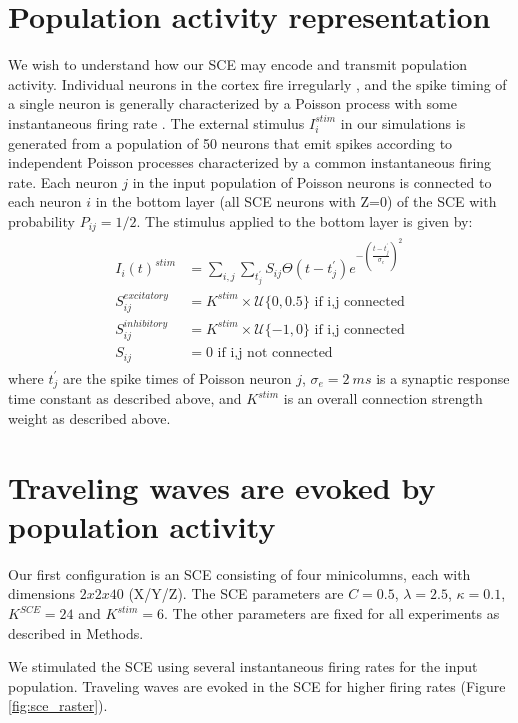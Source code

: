 \section{Population activity representation}
We wish to understand how our SCE may encode and transmit population activity.
Individual neurons in the cortex fire irregularly \citep{Maimon2009}, and the spike timing of a single neuron is generally characterized by a Poisson process with some instantaneous firing rate \citep{Gerstein1964}.
The external stimulus $I_i^{stim}$ in our simulations is generated from a population of 50 neurons that emit spikes according to independent Poisson processes characterized by a common instantaneous firing rate.
Each neuron $j$ in the input population of Poisson neurons is connected to each neuron $i$ in the bottom layer (all SCE neurons with Z=0) of the SCE with probability $P_{ij} = 1/2$.
The stimulus applied to the bottom layer is given by:
\begin{align}
 \begin{split}
  I_i(t)^{stim} &= \sum_{i,j} \sum_{t^\prime_j} S_{ij}  \Theta(t-t^\prime_j)e^{-(\frac{t-t^\prime_j}{\sigma_e})^2}\\
  S_{ij}^{excitatory} &= K^{stim} \times \mathcal{U}\{0,0.5 \} \text{ if i,j connected}\\
  S_{ij}^{inhibitory} &= K^{stim} \times \mathcal{U}\{-1,0 \} \text{ if i,j connected}\\
  S_{ij} &= 0 \text{ if i,j not connected}
 \end{split}
\end{align}
where $t^\prime_j$ are the spike times of Poisson neuron $j$, $\sigma_e=2\ ms$ is a synaptic response time constant as described above, and $K^{stim}$ is an overall connection strength weight as described above.


\section{Traveling waves are evoked by population activity}
Our first configuration is an SCE consisting of four minicolumns, each with dimensions $2x2x40$ (X/Y/Z).
The SCE parameters are $C=0.5$, $\lambda=2.5$, $\kappa=0.1$, $K^{SCE}=24$ and $K^{stim}=6$.
The other parameters are fixed for all experiments as described in Methods.

We stimulated the SCE using several instantaneous firing rates for the input population.
Traveling waves are evoked in the SCE for higher firing rates (Figure \ref{fig:sce_raster}).

